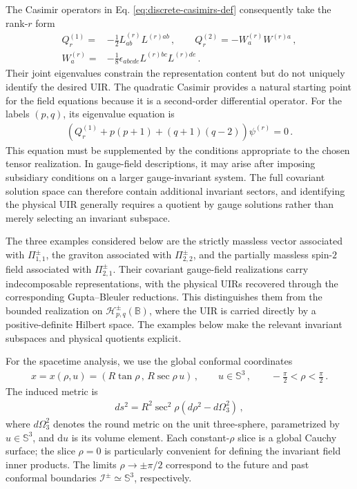 \documentclass{SciPost}
\begin{document}
The Casimir operators in Eq. \eqref{eq:discrete-casimirs-def} consequently take the rank-$r$ form
\begin{align}
    Q^{(1)}_r
    =&-\frac12 L^{(r)}_{ab}L^{(r)ab}
    \,, \qquad
    Q^{(2)}_r=-W^{(r)}_aW^{(r)a} \,,
     \\[3pt]
    W^{(r)}_a
    =&-\frac18\epsilon_{abcde}
    L^{(r)bc}L^{(r)de} \,.
\end{align}
Their joint eigenvalues constrain the representation content but do not uniquely identify the desired UIR. The quadratic Casimir provides a natural starting point for the field equations because it is a second-order differential operator. For the labels $(p,q)$, its eigenvalue equation is
\begin{align} \label{eq:spacetime-Casimir-equation}
    \left(
        Q^{(1)}_r+p(p+1)+(q+1)(q-2)
    \right)\psi^{(r)}=0 \,.
\end{align}
This equation must be supplemented by the conditions appropriate to the chosen tensor realization. In gauge-field descriptions, it may arise after imposing subsidiary conditions on a larger gauge-invariant system. The full covariant solution space can therefore contain additional invariant sectors, and identifying the physical UIR generally requires a quotient by gauge solutions rather than merely selecting an invariant subspace.

The three examples considered below are the strictly massless vector associated with $\Pi^\pm_{1,1}$, the graviton associated with $\Pi^\pm_{2,2}$, and the partially massless spin-$2$ field associated with $\Pi^\pm_{2,1}$. Their covariant gauge-field realizations carry indecomposable representations, with the physical UIRs recovered through the corresponding Gupta--Bleuler reductions. This distinguishes them from the bounded realization on $\mathcal H^\pm_{p,q}(\mathbb B)$, where the UIR is carried directly by a positive-definite Hilbert space. The examples below make the relevant invariant subspaces and physical quotients explicit.

For the spacetime analysis, we use the global conformal coordinates
\begin{align}\label{coor}
    x=x(\rho,u)
    =
    \left(R\tan\rho \,,\, R\sec\rho\,u\right)
    \,, \qquad
    u\in\mathbb S^3
    \,, \qquad
    -\frac{\pi}{2}<\rho<\frac{\pi}{2} \,.
\end{align}
The induced metric is
\begin{align}
    ds^2
    =
    R^2\sec^2\rho
    \left(d\rho^2-d\Omega_3^2\right) \,,
\end{align}
where $d\Omega_3^2$ denotes the round metric on the unit three-sphere, parametrized by $u\in\mathbb S^3$, and $\mathrm{d}u$ is its volume element. Each constant-$\rho$ slice is a global Cauchy surface; the slice $\rho=0$ is particularly convenient for defining the invariant field inner products. The limits $\rho\to\pm\pi/2$ correspond to the future and past conformal boundaries $\mathscr I^\pm\simeq\mathbb S^3$, respectively.
\end{document}
